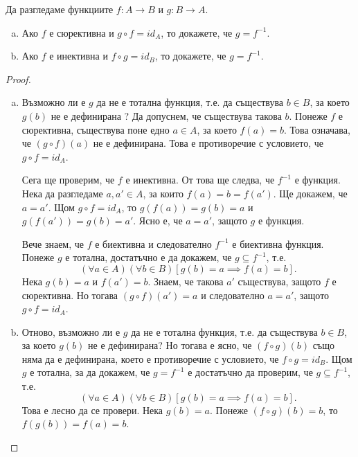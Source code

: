 \begin{problem}
  Да разгледаме функциите $f:A\to B$ и $g:B\to A$.
  \begin{enumerate}[a)]
  \item 
    Ако $f$ е сюрективна и $g\circ f = id_A$, то докажете, че $g = f^{-1}$.
  \item
    Ако $f$ е инективна и $f\circ g = id_B$, то докажете, че $g = f^{-1}$.
  \end{enumerate}
\end{problem}
\begin{proof}
  \begin{enumerate}[a)]
  \item 
    Възможно ли е $g$ да не е тотална функция, т.е. да съществува $b\in B$, 
    за което $g(b)$ не е дефинирана ?
    Да допуснем, че съществува такова $b$. 
    Понеже $f$ е сюрективна, съществува поне едно $a \in A$, за което $f(a) = b$.
    Това означава, че $(g\circ f)(a)$ не е дефинирана. Това е противоречие с условието, че $g\circ f = id_A$.
    
    Сега ще проверим, че $f$ е инективна. От това ще следва, че $f^{-1}$ е функция.
    Нека да разгледаме $a, a' \in A$,  за които $f(a) = b = f(a')$. Ще докажем, че $a = a'$.
    Щом $g\circ f = id_A$, то $g(f(a)) = g(b) = a$  и $g(f(a'))= g(b) = a'$.
    Ясно е, че $a = a'$, защото $g$ е функция.

    Вече знаем, че $f$ е биективна и следователно $f^{-1}$ е биективна функция. 
    Понеже $g$ е тотална, достатъчно е да докажем, че $g \subseteq f^{-1}$, т.е.
    \[(\forall a\in A)(\forall b\in B)[g(b) = a \implies f(a) = b].\]
    Нека $g(b) = a$ и $f(a') = b$. Знаем, че такова $a'$ съществува, защото $f$ е сюрективна.
    Но тогава $(g\circ f)(a') = a$ и следователно $a = a'$, защото $g\circ f = id_A$.
  \item    
    Отново, възможно ли е $g$ да не е тотална функция, т.е. да съществува $b\in B$, за което $g(b)$ не е дефинирана?
    Но тогава е ясно, че $(f\circ g)(b)$ също няма да е дефинирана, което е противоречие с условието, че $f\circ g = id_B$.
    Щом $g$ е тотална, за да докажем, че $g = f^{-1}$ е достатъчно да проверим, че $g\subseteq f^{-1}$, т.е.
    \[(\forall a\in A)(\forall b\in B)[g(b) = a \implies f(a) = b].\]
    Това е лесно да се провери. Нека $g(b) = a$. Понеже $(f\circ g)(b) = b$, то $f(g(b)) = f(a) = b$.
  \end{enumerate}
\end{proof}






